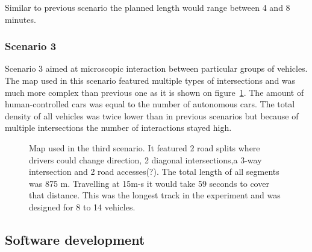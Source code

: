\documentclass[11pt,english]{article}
\begin{document}
Similar to previous scenario the planned length would range between 4 and 8 minutes.


\subsubsection*{Scenario 3}

Scenario 3 aimed at microscopic interaction between particular groups of vehicles. The map used in this scenario featured multiple types of intersections and was much more complex than previous one as it is shown on figure~\ref{fig:map_3_arrows}. The amount of human-controlled cars was equal to the number of autonomous cars. The total density of all vehicles was twice lower than in previous scenarios but because of multiple intersections the number of interactions stayed high.


\begin{figure}[H] %
\caption{Map used in the third scenario. It featured 2 road splits where drivers could change direction, 2 diagonal intersections,a 3-way intersection and 2 road accesses(?). The total length of all segments was 875 m. Travelling at 15m-s it would take 59 seconds to cover that distance. This was the longest track in the experiment and was designed for 8 to 14 vehicles.}
\label{fig:map_3_arrows}
\end{figure}







\subsection{Software development}
\end{document}
